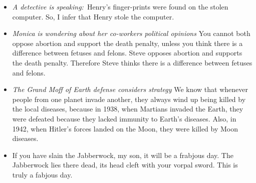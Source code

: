 \begin{itemize}

\item \textit{A detective is speaking:~}Henry's finger-prints were found on the stolen computer. So, I infer that Henry stole the computer.



\item \textit{Monica is wondering about her co-workers political opinions} You cannot both oppose abortion and support the death penalty, unless you think there is a difference between fetuses and felons. Steve opposes abortion and supports the death penalty. Therefore Steve thinks there is a difference between fetuses and felons.



\item \textit{The Grand Moff of Earth defense considers strategy} We know that whenever people from one planet invade another, they always wind up being killed by the local diseases, because in 1938, when Martians invaded the Earth, they were defeated because they lacked immunity to Earth's diseases. Also, in 1942, when Hitler's forces landed on the Moon, they were killed by Moon diseases.



\item If you have slain the Jabberwock, my son, it will be a frabjous day. The Jabberwock lies there dead, its head cleft with your vorpal sword. This is truly a fabjous day.


\end{itemize}
